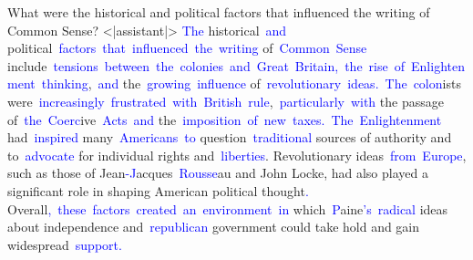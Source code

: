 \documentclass{article}
\begin{document}
\begin{tcolorbox}[colframe=black,colback=white]
What were the historical and political factors that influenced the writing of Common Sense?
<|assistant|>
\textcolor{blue}{The} historical\textcolor{blue}{~and} political\textcolor{blue}{~factors}\textcolor{blue}{~that}\textcolor{blue}{~influenced}\textcolor{blue}{~the}\textcolor{blue}{~writing} of\textcolor{blue}{~Common}\textcolor{blue}{~Sense} include\textcolor{blue}{~tensions}\textcolor{blue}{~between}\textcolor{blue}{~the}\textcolor{blue}{~colonies}\textcolor{blue}{~and}\textcolor{blue}{~Great}\textcolor{blue}{~Britain}\textcolor{blue}{,}\textcolor{blue}{~the}\textcolor{blue}{~rise}\textcolor{blue}{~of}\textcolor{blue}{~Enlightenment}\textcolor{blue}{~thinking},\textcolor{blue}{~and} the\textcolor{blue}{~growing}\textcolor{blue}{~influence} of\textcolor{blue}{~revolutionary}\textcolor{blue}{~ideas}\textcolor{blue}{.}\textcolor{blue}{~The}\textcolor{blue}{~colon}ists were\textcolor{blue}{~increasingly}\textcolor{blue}{~frustrated}\textcolor{blue}{~with}\textcolor{blue}{~British}\textcolor{blue}{~rule},\textcolor{blue}{~particularly}\textcolor{blue}{~with} the passage of\textcolor{blue}{~the}\textcolor{blue}{~Co}\textcolor{blue}{erc}ive\textcolor{blue}{~Acts}\textcolor{blue}{~and} the\textcolor{blue}{~imposition}\textcolor{blue}{~of}\textcolor{blue}{~new}\textcolor{blue}{~taxes}\textcolor{blue}{.}\textcolor{blue}{~The}\textcolor{blue}{~Enlightenment} had\textcolor{blue}{~inspired} many\textcolor{blue}{~Americans}\textcolor{blue}{~to} question\textcolor{blue}{~traditional} sources of authority and to\textcolor{blue}{~advocate} for individual rights and\textcolor{blue}{~liberties}. Revolutionary ideas\textcolor{blue}{~from}\textcolor{blue}{~Europe}, such as those of Jean\textcolor{blue}{-J}acques\textcolor{blue}{~Rousse}au and John Locke, had also played a significant role in shaping American political thought\textcolor{blue}{.} Overall\textcolor{blue}{,}\textcolor{blue}{~these}\textcolor{blue}{~factors}\textcolor{blue}{~created}\textcolor{blue}{~an}\textcolor{blue}{~environment}\textcolor{blue}{~in} which\textcolor{blue}{~P}aine\textcolor{blue}{'s}\textcolor{blue}{~radical} ideas about independence and\textcolor{blue}{~republican} government could take hold and gain widespread\textcolor{blue}{~support}\textcolor{blue}{.}\textcolor{blue}{}
\end{tcolorbox}
\end{document}
